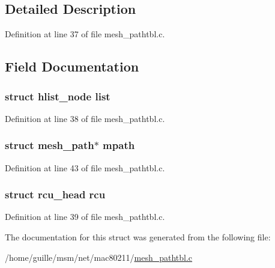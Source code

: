 \subsection{Detailed Description}


Definition at line 37 of file mesh\-\_\-pathtbl.\-c.



\subsection{Field Documentation}
\hypertarget{structmpath__node_a71d95aff87c97c965ee946427631cddf}{
\subsubsection[{list}]{\setlength{\rightskip}{0pt plus 5cm}struct hlist\-\_\-node list}}\label{structmpath__node_a71d95aff87c97c965ee946427631cddf}


Definition at line 38 of file mesh\-\_\-pathtbl.\-c.

\hypertarget{structmpath__node_a90b46ef3dc111348ebc8b6108f58b87e}{
\subsubsection[{mpath}]{\setlength{\rightskip}{0pt plus 5cm}struct {\bf mesh\-\_\-path}$\ast$ mpath}}\label{structmpath__node_a90b46ef3dc111348ebc8b6108f58b87e}


Definition at line 43 of file mesh\-\_\-pathtbl.\-c.

\hypertarget{structmpath__node_aa9677537ffa4e40f3c4f3e9fb3b4c76d}{
\subsubsection[{rcu}]{\setlength{\rightskip}{0pt plus 5cm}struct rcu\-\_\-head rcu}}\label{structmpath__node_aa9677537ffa4e40f3c4f3e9fb3b4c76d}


Definition at line 39 of file mesh\-\_\-pathtbl.\-c.



The documentation for this struct was generated from the following file\-:\begin{DoxyCompactItemize}
\item 
/home/guille/msm/net/mac80211/\hyperlink{mesh__pathtbl_8c}{mesh\-\_\-pathtbl.\-c}\end{DoxyCompactItemize}
